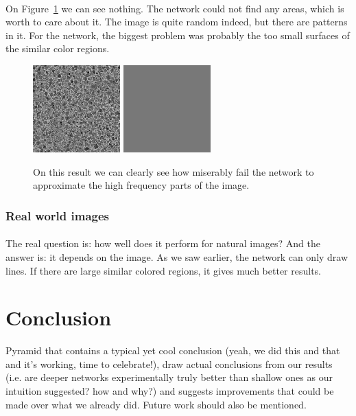 \documentclass[a4paper]{article}
\begin{document}
\paragraph{}On Figure~\ref{fig:pebbles} we can see nothing. The network could not find any areas, which is worth to care about it. The image is quite random indeed, but there are patterns in it. For the network, the biggest problem was probably the too small surfaces of the similar color regions.

\begin{figure}[h]
\centering
\includegraphics[width=0.3\textwidth]{pebbles.jpeg}
\includegraphics[width=0.3\textwidth]{pebbleso.png}
\caption{\label{fig:pebbles}On this result we can clearly see how miserably fail the network to approximate the high frequency parts of the image.}
\end{figure}

\subsubsection{Real world images}

\paragraph{}The real question is: how well does it perform for natural images? And the answer is: it depends on the image. As we saw earlier, the network can only draw lines. If there are large similar colored regions, it gives much better results.

\section{Conclusion}
Pyramid that contains a typical yet cool conclusion (yeah, we did this and that and it's working, time to celebrate!), draw actual conclusions from our results (i.e. are deeper networks experimentally truly better than shallow ones as our intuition suggested? how and why?) and suggests improvements that could be made over what we already did. Future work should also be mentioned.



\end{document}
